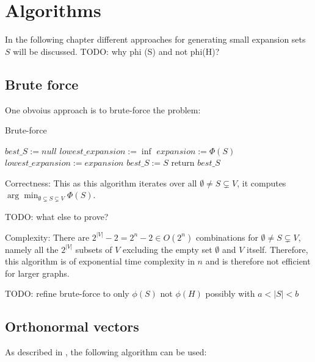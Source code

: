 \chapter{Algorithms}\label{chapter:algorithms}
In the following chapter different approaches for generating small expansion sets $S$ will be discussed.
TODO: why  phi (S) and not phi(H)?


\section{Brute force}
One obvoius approach is to brute-force the problem:
\begin{algorithm}[h!]
	\caption{Brute-force  \label{alg:brute_force}}
	\begin{algorithmic}
		\State $best\_S := null$
		\State $lowest\_expansion := \inf$
		\State $expansion := \Phi(S)$
			\State $lowest\_expansion := expansion$
			\State $best\_S := S$
		\EndIf
		\EndFor	
		\State return $best\_S$
	\end{algorithmic}
\end{algorithm}


Correctness: This as this algorithm iterates over all $\emptyset \neq S \subsetneq V$, it computes $\arg\min_{\emptyset \subsetneq S \subsetneq V} \Phi(S)$.

TODO: what else to prove?


Complexity:
There are $2^{|V|}-2 = 2^{n}-2 \in O(2^n) $ combinations for $\emptyset \neq S \subsetneq V$, namely all the $2^{|V|}$ subsets of $V$ excluding the empty set $\emptyset$ and $V$ itself. Therefore, this algorithm is of exponential time complexity in $n$ and is therefore not efficient for larger graphs.

TODO: refine brute-force to only $\phi(S)$ not $\phi(H)$ possibly with $a<|S|<b$

\section{Orthonormal vectors}
As described in \cite{ChanLTZ16}, the following algorithm can be used:



